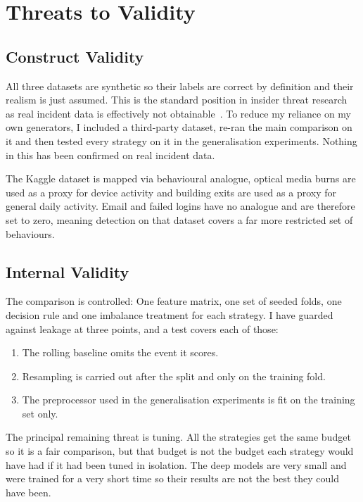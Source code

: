 \documentclass[a4paper,12pt]{article}
\begin{document}
\section{Threats to Validity}
\label{sec:10}

\subsection{Construct Validity}
\label{sec:10.1}

All three datasets are synthetic so their labels are correct by definition and their realism is just assumed. This is the standard position in insider threat research~\cite{kim2020} as real incident data is effectively not obtainable~\cite{glasser2013}. To reduce my reliance on my own generators, I included a third-party dataset, re-ran the main comparison on it and then tested every strategy on it in the generalisation experiments. Nothing in this has been confirmed on real incident data.

The Kaggle dataset is mapped via behavioural analogue, optical media burns are used as a proxy for device activity and building exits are used as a proxy for general daily activity. Email and failed logins have no analogue and are therefore set to zero, meaning detection on that dataset covers a far more restricted set of behaviours.

\subsection{Internal Validity}
\label{sec:10.2}

The comparison is controlled: One feature matrix, one set of seeded folds, one decision rule and one imbalance treatment for each strategy. I have guarded against leakage at three points, and a test covers each of those:

\begin{enumerate}
  \item The rolling baseline omits the event it scores.
  \item Resampling is carried out after the split and only on the training fold.
  \item The preprocessor used in the generalisation experiments is fit on the training set only.
\end{enumerate}
The principal remaining threat is tuning. All the strategies get the same budget so it is a fair comparison, but that budget is not the budget each strategy would have had if it had been tuned in isolation. The deep models are very small and were trained for a very short time so their results are not the best they could have been.
\end{document}
